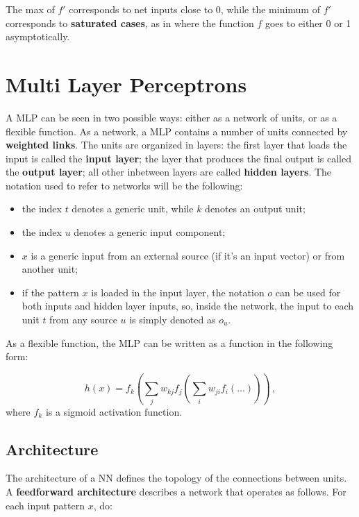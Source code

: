 The max of $f'$ corresponds to net inputs close to 0, while the minimum of $f'$ corresponds to \textbf{saturated cases}, as in where the function $f$ goes to either 0 or 1 asymptotically.

\section{Multi Layer Perceptrons}

A MLP can be seen in two possible ways: either as a network of units, or as a flexible function. As a network, a MLP contains a number of units connected by \textbf{weighted links}. The units are organized in layers: the first layer that loads the input is called the \textbf{input layer}; the layer that produces the final output is called the \textbf{output layer}; all other inbetween layers are called \textbf{hidden layers}. The notation used to refer to networks will be the following:

\begin{itemize}
    \item the index $t$ denotes a generic unit, while $k$ denotes an output unit;

    \item the index $u$ denotes a generic input component;

    \item $x$ is a generic input from an external source (if it's an input vector) or from another unit;

    \item if the pattern $x$ is loaded in the input layer, the notation $o$ can be used for both inputs and hidden layer inputs, so, inside the network, the input to each unit $t$ from any source $u$ is simply denoted as $o_u$.
\end{itemize}
As a flexible function, the MLP can be written as a function in the following form:

\begin{equation*}
    h(x) = f_k(\sum_j w_{kj} f_j (\sum_i w_{ji} f_i(\dots))) \, ,
\end{equation*}
where $f_k$ is a sigmoid activation function.

\subsection{Architecture}

The architecture of a NN defines the topology of the connections between units. A \textbf{feedforward architecture} describes a network that operates as follows. For each input pattern $x$, do:

